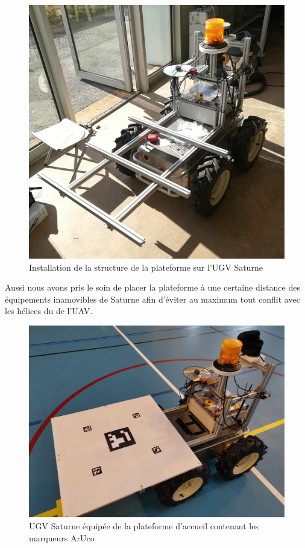 \begin{figure}[H]
    \centering\includegraphics[width=150mm]{images/ugv/ugv2.jpg}
    \caption{Installation de la structure de la plateforme sur l'UGV Saturne}
\end{figure}

Aussi nous avons pris le soin de placer la plateforme à une certaine distance des équipements inamovibles de Saturne afin d’éviter au maximum tout conflit avec les hélices du de l’UAV.

\begin{figure}[H]
    \centering\includegraphics[width=150mm]{images/ugv/ugv3.jpg}
    \caption{UGV Saturne équipée de la plateforme d'accueil contenant les marqueurs ArUco}
\end{figure}

